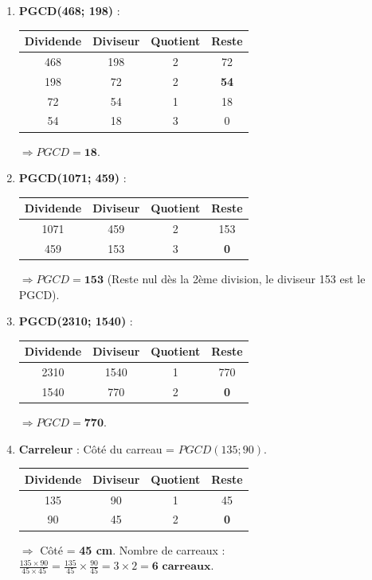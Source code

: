 \documentclass[11pt]{article}
\begin{document}
\begin{corrige}[Exercice n°1]
\begin{enumerate}
    \item \textbf{PGCD(468; 198)} :
    \begin{tabular}{|c|c|c|c|}\hline \rowcolor{popblueL} Dividende & Diviseur & Quotient & Reste \\ \hline 468 & 198 & 2 & 72 \\ \hline 198 & 72 & 2 & \cellcolor{popgreenL}\textbf{54} \\ \hline 72 & 54 & 1 & 18 \\ \hline 54 & 18 & 3 & 0 \\ \hline \end{tabular} $\Rightarrow PGCD = \mathbf{18}$.
    \item \textbf{PGCD(1071; 459)} :
    \begin{tabular}{|c|c|c|c|}\hline \rowcolor{popblueL} Dividende & Diviseur & Quotient & Reste \\ \hline 1071 & 459 & 2 & 153 \\ \hline 459 & 153 & 3 & \cellcolor{popgreenL}\textbf{0} \\ \hline \end{tabular} $\Rightarrow PGCD = \mathbf{153}$ (Reste nul dès la 2ème division, le diviseur 153 est le PGCD).
    \item \textbf{PGCD(2310; 1540)} :
    \begin{tabular}{|c|c|c|c|}\hline \rowcolor{popblueL} Dividende & Diviseur & Quotient & Reste \\ \hline 2310 & 1540 & 1 & 770 \\ \hline 1540 & 770 & 2 & \cellcolor{popgreenL}\textbf{0} \\ \hline \end{tabular} $\Rightarrow PGCD = \mathbf{770}$.
    \item \textbf{Carreleur} : Côté du carreau = $PGCD(135; 90)$.
    \begin{tabular}{|c|c|c|c|}\hline \rowcolor{popblueL} Dividende & Diviseur & Quotient & Reste \\ \hline 135 & 90 & 1 & 45 \\ \hline 90 & 45 & 2 & \cellcolor{popgreenL}\textbf{0} \\ \hline \end{tabular} $\Rightarrow$ Côté = \textbf{45 cm}.
    Nombre de carreaux : $\frac{135 \times 90}{45 \times 45} = \frac{135}{45} \times \frac{90}{45} = 3 \times 2 = \textbf{6 carreaux}$.
\end{enumerate}
\end{corrige}
\end{document}
